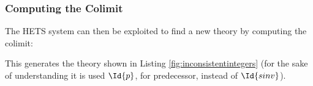 \subsubsection{Computing the Colimit}
The HETS system \parencite{MossakowskiEA06} can then be exploited to
find a new theory by computing the colimit:
\begin{center}
\end{center}
This generates the theory shown in Listing \ref{fig:inconsistentintegers}
(for the sake of understanding it is used $\Id{p}$, for predecessor, instead of $\Id{sinv}$).

